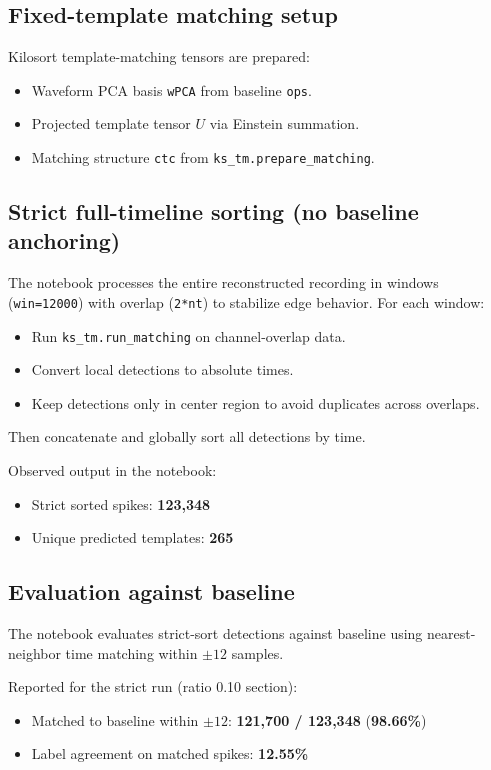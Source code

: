 ﻿\documentclass[11pt]{article}
\begin{document}
\subsection{Fixed-template matching setup}
Kilosort template-matching tensors are prepared:
\begin{itemize}
  \item Waveform PCA basis \texttt{wPCA} from baseline \texttt{ops}.
  \item Projected template tensor $U$ via Einstein summation.
  \item Matching structure \texttt{ctc} from \texttt{ks\_tm.prepare\_matching}.
\end{itemize}

\subsection{Strict full-timeline sorting (no baseline anchoring)}
The notebook processes the entire reconstructed recording in windows (\texttt{win=12000}) with overlap (\texttt{2*nt}) to stabilize edge behavior. For each window:
\begin{itemize}
  \item Run \texttt{ks\_tm.run\_matching} on channel-overlap data.
  \item Convert local detections to absolute times.
  \item Keep detections only in center region to avoid duplicates across overlaps.
\end{itemize}
Then concatenate and globally sort all detections by time.

Observed output in the notebook:
\begin{itemize}
  \item Strict sorted spikes: \textbf{123,348}
  \item Unique predicted templates: \textbf{265}
\end{itemize}

\subsection{Evaluation against baseline}
The notebook evaluates strict-sort detections against baseline using nearest-neighbor time matching within $\pm 12$ samples.

Reported for the strict run (ratio 0.10 section):
\begin{itemize}
  \item Matched to baseline within $\pm 12$: \textbf{121,700 / 123,348} (\textbf{98.66\%})
  \item Label agreement on matched spikes: \textbf{12.55\%}
\end{itemize}
\end{document}

